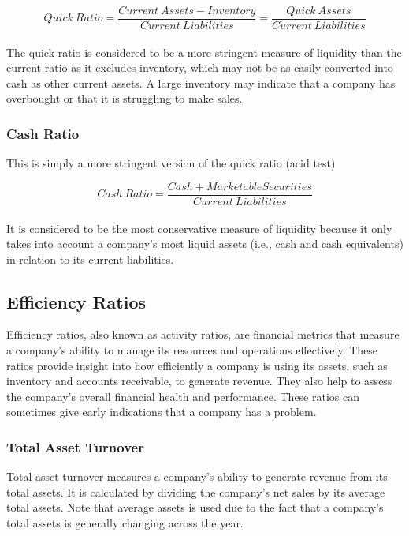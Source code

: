 \documentclass{article}
\begin{document}
 \begin{equation}
    Quick\: Ratio = \frac{Current\: Assets - Inventory}{Current\: Liabilities} = \frac{Quick\: Assets}{Current\: Liabilities}
\end{equation}\\

The quick ratio is considered to be a more stringent measure of liquidity than the current ratio as it excludes inventory, which may not be as easily converted into cash as other current assets. A large inventory may indicate that a company has overbought or that it is struggling to make sales. 

\subsubsection{Cash Ratio}
This is simply a more stringent version of the quick ratio (acid test)

\begin{equation}
    Cash\: Ratio = \frac{Cash + Marketable Securities}{Current\: Liabilities} 
\end{equation}\\

It is considered to be the most conservative measure of liquidity because it only takes into account a company's most liquid assets (i.e., cash and cash equivalents) in relation to its current liabilities.

\subsection{Efficiency Ratios}
Efficiency ratios, also known as activity ratios, are financial metrics that measure a company's ability to manage its resources and operations effectively. These ratios provide insight into how efficiently a company is using its assets, such as inventory and accounts receivable, to generate revenue. They also help to assess the company's overall financial health and performance. These ratios can sometimes give early indications that a company has a problem.

\subsubsection{Total Asset Turnover}
Total asset turnover measures a company's ability to generate revenue from its total assets. It is calculated by dividing the company's net sales by its average total assets. Note that average assets is used due to the fact that a company's total assets is generally changing across the year. 
\end{document}
